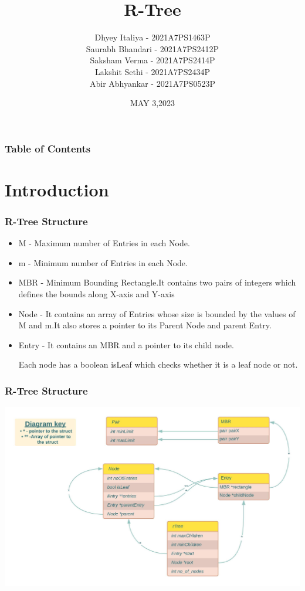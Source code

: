 \documentclass{beamer}
\date{MAY 3,2023}
\title[R-Tree] %
{R-Tree}
\author[] %
{Dhyey Italiya - 2021A7PS1463P\\Saurabh Bhandari - 2021A7PS2412P\\ Saksham Verma - 2021A7PS2414P\\Lakshit Sethi - 2021A7PS2434P\\Abir Abhyankar - 2021A7PS0523P}
\institute[BITS Pilani] %
{
  Birla Institute of Technology and Science,Pilani\\
  Dr.Jagat Sesh Challa
}
\begin{document}
\frame{\titlepage}


\begin{frame}
\frametitle{Table of Contents}
\tableofcontents
\end{frame}

\section{Introduction}
\begin{frame}
\frametitle{R-Tree Structure}
\begin{itemize}
    \item M - Maximum number of Entries in each Node.
    \item m - Minimum number of Entries in each Node.
    \item MBR - Minimum Bounding Rectangle.It contains two pairs of integers which defines the bounds along X-axis and Y-axis
    \item Node - It contains an array of Entries whose size is bounded by the values of M and m.It also stores a pointer to its Parent Node and parent Entry.
    \item Entry - It contains an MBR and a pointer to its child node.\bigskip
    
    Each node has a boolean isLeaf which checks whether it is a leaf node or not.
\end{itemize}
\end{frame}

\begin{frame}
\frametitle{R-Tree Structure}
\includegraphics[scale=0.7,center]{Structs_relations.jpeg}
\end{frame}
\end{document}
